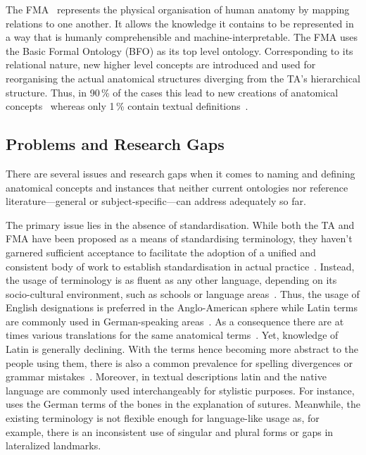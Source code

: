 \documentclass[sw]{iosart2x}
\begin{document}
The FMA~\citep{fma} represents the physical organisation of human anatomy by mapping relations to one another.
It allows the knowledge it contains to be represented in a way that is humanly comprehensible and machine-interpretable.
The FMA uses the Basic Formal Ontology (BFO) as its top level ontology.
Corresponding to its relational nature, new higher level concepts are introduced and used for reorganising the actual anatomical structures diverging from the TA’s hierarchical structure.
Thus, in 90\,\% of the cases this lead to new creations of anatomical concepts~\citep{anatomicalterms} whereas only 1\,\% contain textual definitions~\citep{uberon}.

\subsection{Problems and Research Gaps}

There are several issues and research gaps when it comes to naming and defining anatomical concepts and instances that neither current ontologies nor reference literature---general or subject-specific---can address adequately so far.

The primary issue lies in the absence of standardisation.
While both the TA and FMA have been proposed as a means of standardising terminology, they haven't garnered sufficient acceptance to facilitate the adoption of a unified and consistent body of work to establish standardisation in actual practice~\citep{frequencyta,doestamatter,athighlights}.
Instead, the usage of terminology is as fluent as any other language, depending on its socio-cultural environment, such as schools or language areas~\citep{doestamatter,atthennow,atinfo,frequencyta,atcompare}.
Thus, the usage of English designations is preferred in the Anglo-American sphere while Latin terms are commonly used in German-speaking areas~\citep{anatomycontribution,anatomylexicon,reforminganatomical}.
As a consequence there are at times various translations for the same anatomical terms~\citep{naminggame}.
Yet, knowledge of Latin is generally declining.
With the terms hence becoming more abstract to the people using them, there is also a common prevalence for spelling divergences or grammar mistakes~\citep{ta17,anatomylexicon,athighlights,diphthongs}.
Moreover, in textual descriptions latin and the native language are commonly used interchangeably for stylistic purposes.
For instance, \cite{anatomylexicon} uses the German terms of the bones in the explanation of sutures.
Meanwhile, the existing terminology is not flexible enough for language-like usage as, for example, there is an inconsistent use of singular and plural forms or gaps in lateralized landmarks.
\end{document}
